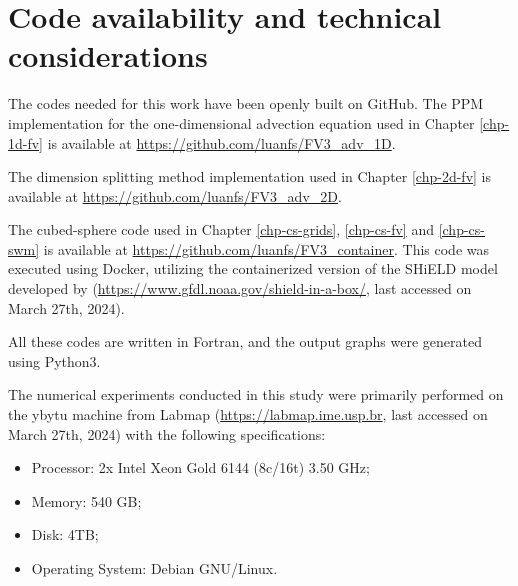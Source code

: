 \chapter{Code availability and technical considerations}
\label{anexo-code}
The codes needed for this work have been openly built on GitHub. 
The PPM implementation for the one-dimensional advection equation used in Chapter \ref{chp-1d-fv} is available at \url{https://github.com/luanfs/FV3_adv_1D}.

The dimension splitting method implementation used in Chapter \ref{chp-2d-fv} is available at \url{https://github.com/luanfs/FV3_adv_2D}.

The cubed-sphere code used in Chapter \ref{chp-cs-grids}, \ref{chp-cs-fv} and \ref{chp-cs-swm} is available at \url{https://github.com/luanfs/FV3_container}.
This code was executed using Docker, utilizing the containerized version of the SHiELD model developed by \citet{cheng:2022}
(\url{https://www.gfdl.noaa.gov/shield-in-a-box/}, last accessed on March 27th, 2024).


All these codes are written in Fortran, and the output graphs were generated using Python3.

The numerical experiments conducted in this study were primarily performed on the ybytu machine from Labmap 
(\url{https://labmap.ime.usp.br}, last accessed on March 27th, 2024) with the following specifications:
\begin{itemize}
	\item Processor: 2x Intel Xeon Gold 6144 (8c/16t) 3.50 GHz;
	\item Memory: 540 GB;
	\item Disk: 4TB;
	\item Operating System: Debian GNU/Linux.
\end{itemize}




